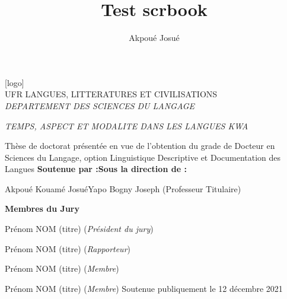 \documentclass[12pt]{scrbook}[2015/10/03]
\author{Akpoué Josué}
\title{Test scrbook}
\begin{document}
	\def\covcol{blue!11!white}
	\begin{titlepage}
		\fontsize{13pt}{13pt}\selectfont
		\pagecolor{\covcol}
		\centering
		\vspace*{1em}
		[logo]\\
		\vspace*{.5em}
		UFR LANGUES, LITTERATURES ET CIVILISATIONS\\
		\textit{DEPARTEMENT DES SCIENCES DU LANGAGE}\par
		\vfil
			\def\boxsep{.61pt}
		\begin{mdframed}[linewidth=1.6pt,%
			roundcorner=18pt,innerbottommargin=\boxsep,innerleftmargin=\boxsep,innerrightmargin=\boxsep,innertopmargin=\boxsep,backgroundcolor=\covcol]
			\begin{mdframed}[linewidth=3.4pt,%
				roundcorner=17pt,innerbottommargin=\boxsep,innerleftmargin=\boxsep,innerrightmargin=\boxsep,innertopmargin=\boxsep,backgroundcolor=\covcol]
				\renewcommand\boxsep{2.5em}
				\begin{mdframed}[linewidth=1.6pt,%
					roundcorner=16pt,innerbottommargin=\boxsep,innertopmargin=\boxsep,innerleftmargin=\boxsep,innerrightmargin=\boxsep,backgroundcolor=\covcol]
					\begin{center}
						{\LARGE
						\sffamily 
						\itshape
						TEMPS, ASPECT ET MODALITE DANS LES LANGUES KWA}
					\end{center}
				\end{mdframed}
			\end{mdframed}
		\end{mdframed}
		\vspace*{2em}
		Thèse de doctorat présentée en vue de l’obtention du grade de  Docteur en Sciences du Langage, 
		option Linguistique Descriptive et Documentation des Langues
		\vfil 
		\textbf{Soutenue par :}\hfill\textbf{Sous la direction de :}\par
		Akpoué Kouamé Josué\hfill Yapo Bogny Joseph (Professeur Titulaire)\par 
		\vfil
		\textbf{Membres du Jury}\par\vspace*{1em}
		Prénom NOM (titre) (\textit{Président du jury})\par 
		Prénom NOM (titre) (\textit{Rapporteur})\par 
		Prénom NOM (titre) (\textit{Membre})\par 
		Prénom NOM (titre) (\textit{Membre})
		\vfil
		Soutenue publiquement le 12 décembre 2021
		
	\end{titlepage}\pagecolor{white}
\end{document}

